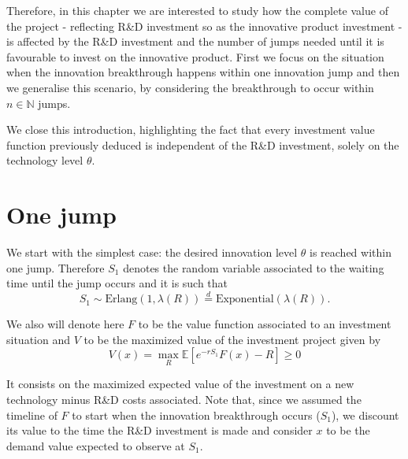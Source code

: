 


Therefore, in this chapter we are interested to study how the complete value of the project - reflecting R\&D investment so as the innovative product investment - is affected by the R\&D investment and the number of jumps needed until it is favourable to invest on the innovative product. First we focus on the situation when the innovation breakthrough happens within one innovation jump and then we generalise this scenario, by considering the breakthrough to occur within $n\in\mathds{N}$ jumps.


We close this introduction, highlighting the fact that every investment value function previously deduced is independent of the R\&D investment, solely on the technology level $\theta$.

\section{One jump}
\label{section:max_1jump}

We start with the simplest case: the desired innovation level $\theta$ is reached within one jump.
Therefore $S_1$ denotes the random variable associated to the waiting time until the jump occurs and it is such that
$$S_1 \sim \text{Erlang}(1,\lambda(R)) \overset{d}{=} \text{Exponential}(\lambda(R)).$$

We also will denote here $F$ to be the value function associated to an investment situation and $V$ to be the maximized value of the investment project given by
\begin{equation}
	V(x)=\max_R \mathds{E} [ e^{-rS_1}F(x)-R]\geq 0
	\label{max_V}
\end{equation}

It consists on the maximized expected value of the investment on a new technology minus R\&D costs associated. Note that, since we assumed the timeline of $F$ to start when the innovation breakthrough occurs ($S_1$), we discount its value to the time the R\&D investment is made and consider $x$ to be the demand value expected to observe at $S_1$.

